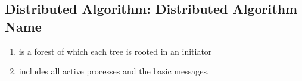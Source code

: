 \documentclass[letterpaper,10pt,english]{sphinxmanual}
\begin{document}
\subsection{Distributed Algorithm: Distributed Algorithm Name}
\label{\detokenize{docs/ShavitFranchezAlg/algorithm:distributed-algorithm-shavitfranchezalg}}\begin{description}
\begin{enumerate}
%
\item {} 
\sphinxAtStartPar
{} is a forest of which each tree is rooted in an initiator

\item {} 
\sphinxAtStartPar
{} includes all active processes and the basic messages.

\end{enumerate}

\end{description}
\end{document}
